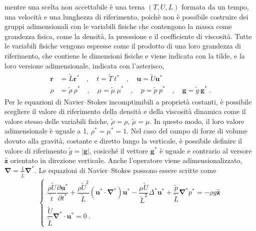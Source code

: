 \documentclass[letterpaper,10pt,italian]{jupyterBook}
\begin{document}
\sphinxAtStartPar
mentre una scelta non accettabile è una terna \((T,U,L)\) formata da un
tempo, una velocità e una lunghezza di riferimento, poichè non è
possibile costruire dei gruppi adimensionali con le variabili fisiche
che contengono la massa come grandezza fisica, come la densità, la
presssione e il coefficiente di viscosità. Tutte le variabili fisiche
vengono espresse come il prodotto di una loro grandezza di riferimento,
che contiene le dimensioni fisiche e viene indicata con la tilde, e la
loro versione adimensionale, indicata con l’asterisco,
\begin{equation*}
\begin{split}\begin{aligned}
\mathbf{r} & = \tilde{L} \mathbf{r}^* \quad , \quad t = \tilde{T}\ t^* \quad , \quad \mathbf{u} = \tilde{U} \mathbf{u}^* \\
\rho & = \tilde{\rho} \ \rho^* \quad , \quad \mu = \tilde{\mu} \ \mu^* \quad , \quad 
p = \tilde{p} \ p^* \quad , \quad \mathbf{g} = \tilde{g} \ \mathbf{g}^* \ .
\end{aligned}\end{split}
\end{equation*}
\sphinxAtStartPar
Per le equazioni di Navier–Stokes incomptimibili a
proprietà costanti, è possibile scegliere il valore di riferimento della
densità e della viscosità dinamica come il valore stesso delle variabili
fisiche, \(\tilde{\rho} = \rho\), \(\tilde{\mu} = \mu\). In questo modo, il
loro valore adimensionale è uguale a 1, \(\rho^* = \mu^* = 1\). Nel caso
del campo di forze di volume dovuto alla gravità, costante e diretto
lungo la verticale, è possibile definire il valore di riferimento
\(\tilde{g} = |\mathbf{g}|\), cosicché il vettore \(\mathbf{g}^*\) è uguale e
contrario al versore \(\mathbf{\hat{z}}\) orientato in direzione verticale.
Anche l’operatore  viene adimensionalizzato,
\(\mathbf{\nabla} = \frac{1}{\tilde{L}} \mathbf{\nabla}^*\). Le equazioni di
Navier–Stokes possono essere scritte come
\begin{equation*}
\begin{split}\begin{cases}
 \dfrac{\rho \tilde{U}}{\tilde{t}} \dfrac{\partial \mathbf{u}^*}{\partial t^*} + \dfrac{\rho \tilde{U}^2}{\tilde{L}} (\mathbf{u}^* \cdot \mathbf{\nabla}^*) \mathbf{u}^* - \dfrac{\mu \tilde{U}}{\tilde{L}^2} \Delta^* \mathbf{u}^* + \dfrac{\tilde{p}}{\tilde{L}} \mathbf{\nabla}^* p^* = -\rho g \mathbf{\hat{z}} \\
 \dfrac{\tilde{U}}{\tilde{L}}\mathbf{\nabla}^* \cdot \mathbf{u}^* = 0 \ .
\end{cases}\end{split}
\end{equation*}
\end{document}

